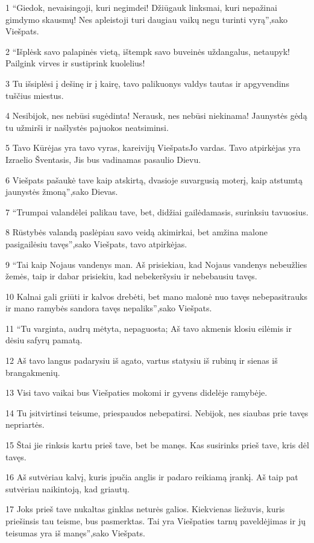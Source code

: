 \par 1 “Giedok, nevaisingoji, kuri negimdei! Džiūgauk linksmai, kuri nepažinai gimdymo skausmų! Nes apleistoji turi daugiau vaikų negu turinti vyrą”,­sako Viešpats. 
\par 2 “Išplėsk savo palapinės vietą, ištempk savo buveinės uždangalus, netaupyk! Pailgink virves ir sustiprink kuolelius! 
\par 3 Tu išsiplėsi į dešinę ir į kairę, tavo palikuonys valdys tautas ir apgyvendins tuščius miestus. 
\par 4 Nesibijok, nes nebūsi sugėdinta! Nerausk, nes nebūsi niekinama! Jaunystės gėdą tu užmirši ir našlystės pajuokos neatsiminsi. 
\par 5 Tavo Kūrėjas yra tavo vyras, kareivijų Viešpats­Jo vardas. Tavo atpirkėjas yra Izraelio Šventasis, Jis bus vadinamas pasaulio Dievu. 
\par 6 Viešpats pašaukė tave kaip atskirtą, dvasioje suvargusią moterį, kaip atstumtą jaunystės žmoną”,­sako Dievas. 
\par 7 “Trumpai valandėlei palikau tave, bet, didžiai gailėdamasis, surinksiu tavuosius. 
\par 8 Rūstybės valandą paslėpiau savo veidą akimirkai, bet amžina malone pasigailėsiu tavęs”,­sako Viešpats, tavo atpirkėjas. 
\par 9 “Tai kaip Nojaus vandenys man. Aš prisiekiau, kad Nojaus vandenys nebeužlies žemės, taip ir dabar prisiekiu, kad nebekeršysiu ir nebebausiu tavęs. 
\par 10 Kalnai gali griūti ir kalvos drebėti, bet mano malonė nuo tavęs nebepasitrauks ir mano ramybės sandora tavęs nepaliks”,­sako Viešpats. 
\par 11 “Tu varginta, audrų mėtyta, nepaguosta; Aš tavo akmenis klosiu eilėmis ir dėsiu safyrų pamatą. 
\par 12 Aš tavo langus padarysiu iš agato, vartus statysiu iš rubinų ir sienas iš brangakmenių. 
\par 13 Visi tavo vaikai bus Viešpaties mokomi ir gyvens didelėje ramybėje. 
\par 14 Tu įsitvirtinsi teisume, priespaudos nebepatirsi. Nebijok, nes siaubas prie tavęs nepriartės. 
\par 15 Štai jie rinksis kartu prieš tave, bet be manęs. Kas susirinks prieš tave, kris dėl tavęs. 
\par 16 Aš sutvėriau kalvį, kuris įpučia anglis ir padaro reikiamą įrankį. Aš taip pat sutvėriau naikintoją, kad griautų. 
\par 17 Joks prieš tave nukaltas ginklas neturės galios. Kiekvienas liežuvis, kuris priešinsis tau teisme, bus pasmerktas. Tai yra Viešpaties tarnų paveldėjimas ir jų teisumas yra iš manęs”,­sako Viešpats.




